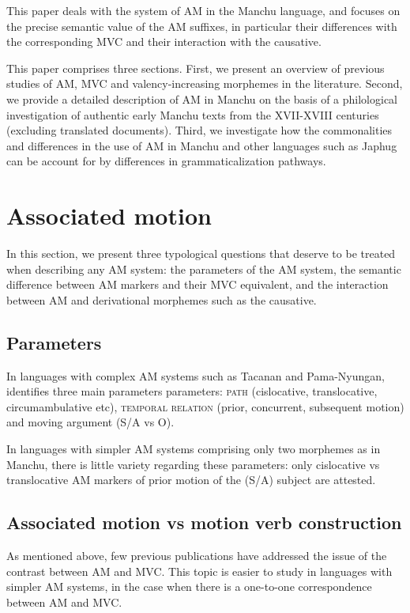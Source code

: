 \documentclass{article}
\begin{document}
This paper deals with the system of AM in the Manchu language, and focuses on the precise semantic value of the AM suffixes, in particular their differences with the corresponding MVC and their interaction with the causative. 

This paper comprises three sections. First, we present an overview of previous studies of AM, MVC and valency-increasing morphemes in the literature. Second, we provide a detailed description of AM in Manchu on the basis of a philological investigation of authentic early Manchu texts from the XVII-XVIII centuries (excluding translated documents). Third, we investigate how the commonalities and differences in the use of AM in Manchu and other languages such as Japhug can be account for by differences in grammaticalization pathways.

\section{Associated motion}
In this section, we present three typological questions that deserve to be treated when describing any AM system: the parameters of the AM system, the semantic difference between AM markers and their MVC equivalent, and the interaction between AM and derivational morphemes such as the causative.

\subsection{Parameters}
In languages with complex AM systems such as Tacanan and Pama-Nyungan, \citet[8]{guillaume16am} identifies three main parameters parameters: \textsc{path} (cislocative, translocative, circumambulative etc),  \textsc{temporal relation} (prior, concurrent, subsequent motion) and moving argument (S/A vs O). 

In languages with simpler AM systems comprising only two morphemes as in Manchu, there is little variety regarding these parameters: only cislocative vs translocative AM markers of prior motion of the (S/A) subject are attested.

\subsection{Associated motion vs motion verb construction} \label{sec:japhug.am.mvc}
As mentioned above, few previous publications have addressed the issue of the contrast between AM and MVC. This topic is easier to study in languages with simpler AM systems, in the case when there is a one-to-one correspondence between AM and MVC.
\end{document}
